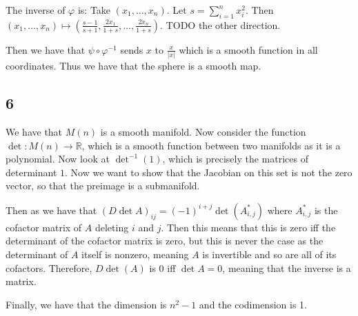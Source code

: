 \documentclass{article}
\theoremstyle{definition}
\numberwithin{theorem}{section}
\numberwithin{equation}{section}
\begin{document}
The inverse of $\varphi$ is: Take $(x_1, \ldots, x_n)$. Let $s = \sum_{i = 1}^n x_i^2$. Then $(x_1, \ldots, x_n) \mapsto (\frac{s - 1}{s + 1}, \frac{2x_1}{1 + s}, \ldots, \frac{2x_n}{1 + s})$. TODO the other direction. 

Then we have that $\psi \circ \varphi^{-1}$ sends $x$ to $ \frac{x}{|x|}$ which is a smooth function in all coordinates. Thus we have that the sphere is a smooth map. 

\subsection{6}
We have that $M(n)$ is a smooth manifold. Now consider the function $\det : M(n) \rightarrow \mathbb{R}$, which is a smooth function between two manifolds as it is a polynomial. Now look at $\det^{-1} (1)$, which is precisely the matrices of determinant $1$. Now we want to show that the Jacobian on this set is not the zero vector, so that the preimage is a submanifold. 

Then as we have that $(D \det A)_{ij} = (-1)^{i + j} \det(A^*_{i, j})$ where $A^*_{i, j}$ is the cofactor matrix of $A$ deleting $i$ and $j$. Then this means that this is zero iff the determinant of the cofactor matrix is zero, but this is never the case as the determinant of $A$ itself is nonzero, meaning $A$ is invertible and so are all of its cofactors. Therefore, $D \det(A)$ is 0 iff $\det A = 0$, meaning that the inverse is a matrix. 

Finally, we have that the dimension is $n^2-1$ and the codimension is 1. 
\end{document}

